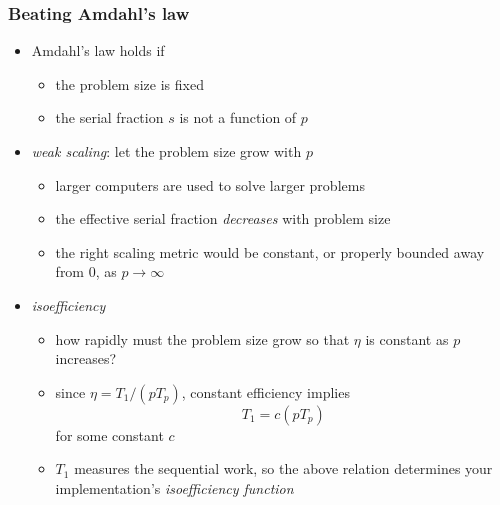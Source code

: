 \begin{frame}[fragile]
%
  \frametitle{Beating Amdahl's law}
%
  \begin{itemize}
  \item Amdahl's law holds if
    \begin{itemize}
      \item the problem size is fixed
      \item the serial fraction $s$ is not a function of $p$
    \end{itemize}
%
  \item {\em weak scaling}: let the problem size grow with $p$
    \begin{itemize}
    \item larger computers are used to solve larger problems
    \item the effective serial fraction {\em decreases} with problem size
    \item the right scaling metric would be constant, or properly bounded away from 0, as $p
      \rightarrow \infty$
    \end{itemize}
%
  \item {\em isoefficiency}
    \begin{itemize}
      \item how rapidly must the problem size grow so that $\eta$ is constant as $p$ increases?
      \item since $\eta = T_{1}/(pT_{p})$, constant efficiency implies
        \[
        T_{1} = c (p T_{p})
        \]
        for some constant $c$
      \item $T_{1}$ measures the sequential work, so the above relation determines your
        implementation's {\em isoefficiency function}
    \end{itemize}
%
  \end{itemize}
%
\end{frame}



